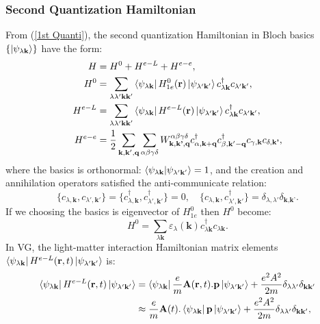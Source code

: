 \documentclass[12pt,english,a4paper]{article}
\newcommand{\dg}{\dagger}
\begin{document}
	\subsubsection{Second Quantization Hamiltonian}
	\quad From (\ref{1st Quanti}), the second quantization Hamiltonian in Bloch basics $\{\ket{\psi_{\lambda \textbf{k}}}\}$ have the form:
	\begin{align}
		H &= H^0 + H^{e-L}  + H^{e-e}\nonumber,\\
		\label{Second Hamiltonian}
		H^0 &= \sum_{\lambda \lambda' \textbf{k}\textbf{k}'} \bra{\psi_{\lambda \textbf{k}}} H^0_{1e} (\textbf{r})\ket{\psi_{\lambda' \textbf{k}'}} c^\dg_{\lambda \textbf{k}} c_{\lambda' \textbf{k}
		'} ,\\
		H^{e-L} &= \sum_{\lambda \lambda' \textbf{k}\textbf{k}'} \bra{\psi_{\lambda \textbf{k}}} H^{e-L} (\textbf{r})\ket{\psi_{\lambda' \textbf{k}'}} c^\dg_{\lambda \textbf{k}} c_{\lambda' \textbf{k}
			'}\nonumber ,\\
H^{e-e}	&= \frac{1}{2} \sum_{\textbf{k}, \textbf{k}', \textbf{q}} \sum_{\alpha \beta \gamma \delta} W^{\alpha \beta \gamma \delta}_{\textbf{k},\textbf{k'},\textbf{q}} c_{\alpha, \textbf{k}+\textbf{q}}^\dg c_{\beta, \textbf{k}' - \textbf{q}}^\dg c_{\gamma, \textbf{k}}c_{\delta, \textbf{k'}} \nonumber,
	\end{align}
	where the basics is orthonormal: $\braket{\psi_{\lambda \textbf{k}}}{\psi_{\lambda' \textbf{k}'}} = 1$, and the creation and annihilation operators satisfied the anti-communicate relation:
	\begin{equation}
		\label{fermion comm}
		\big\{c_{\lambda,\textbf{k}}, c_{\lambda', \textbf{k}'}\big\} =\big\{c^\dg_{\lambda,\textbf{k}}, c^\dg_{\lambda', \textbf{k}'}\big\} = 0, \quad \big\{c_{\lambda,\textbf{k}}, c^\dg_{\lambda', \textbf{k}'}\big\} = \delta_{\lambda,\lambda'}\delta_{\textbf{k},\textbf{k'}}.
	\end{equation}
	\quad If we choosing the basics is eigenvector of $H^0_{1e}$ then $H^0$ become:
	\begin{equation}
		H^0 = \sum_{\lambda \textbf{k}} \varepsilon_{\lambda}(\textbf{k})c^\dg_{\lambda \textbf{k}} c_{\lambda \textbf{k}}.
	\end{equation} 
	\quad In VG, the light-matter interaction Hamiltonian matrix elements $\bra{\psi_{\lambda\textbf{k}}}H^{e-L}(\textbf{r},t)\ket{\psi_{\lambda'\textbf{k}'}}$ is:
	\begin{align}
		\bra{\psi_{\lambda\textbf{k}}}H^{e-L}(\textbf{r},t)\ket{\psi_{\lambda'\textbf{k}'}} &= \bra{\psi_{\lambda\textbf{k}}}\frac{e}{m}\textbf{A}(\textbf{r},t).\textbf{p}\ket{\psi_{\lambda'\textbf{k}'}} +\frac{e^2 A^2}{2m} \delta_{\lambda \lambda'}\delta_{\textbf{k}\textbf{k}'} \nonumber\\
		&\approx \frac{e}{m}\textbf{A}(t). \bra{\psi_{\lambda\textbf{k}}}\textbf{p}\ket{\psi_{\lambda'\textbf{k}'}} + \frac{e^2 A^2}{2m} \delta_{\lambda \lambda'}\delta_{\textbf{k}\textbf{k}'},
	\end{align}
\end{document}
